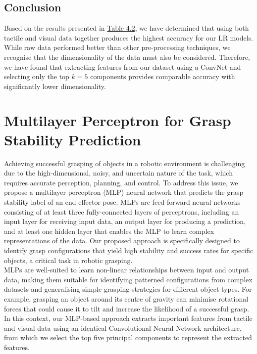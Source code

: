 \documentclass[11pt, a4paper]{report}
\begin{document}
\section{Conclusion}\label{sec:4.6}
Based on the results presented in \hyperref[tbl:4.2]{Table 4.2}, we have determined that using both tactile and visual data together produces the highest accuracy for our LR models. While raw data performed better than other pre-processing techniques, we recognise that the dimensionality of the data must also be considered. Therefore, we have found that extracting features from our dataset using a ConvNet and selecting only the top $k=5$ components provides comparable accuracy with significantly lower dimensionality.



\chapter{Multilayer Perceptron for Grasp Stability Prediction}\label{chap:5}
Achieving successful grasping of objects in a robotic environment is challenging due to the high-dimensional, noisy, and uncertain nature of the task, which requires accurate perception, planning, and control. To address this issue, we propose a multilayer perceptron (MLP) neural network that predicts the grasp stability label of an end effector pose. MLPs are feed-forward neural networks consisting of at least three fully-connected layers of perceptrons, including an input layer for receiving input data, an output layer for producing a prediction, and at least one hidden layer that enables the MLP to learn complex representations of the data. Our proposed approach is specifically designed to identify grasp configurations that yield high stability and success rates for specific objects, a critical task in robotic grasping.\\

MLPs are well-suited to learn non-linear relationships between input and output data, making them suitable for identifying patterned configurations from complex datasets and generalising simple grasping strategies for different object types. For example, grasping an object around its centre of gravity can minimise rotational forces that could cause it to tilt and increase the likelihood of a successful grasp. In this context, our MLP-based approach extracts important features from tactile and visual data using an identical Convolutional Neural Network architecture, from which we select the top five principal components to represent the extracted features.\\
\end{document}
